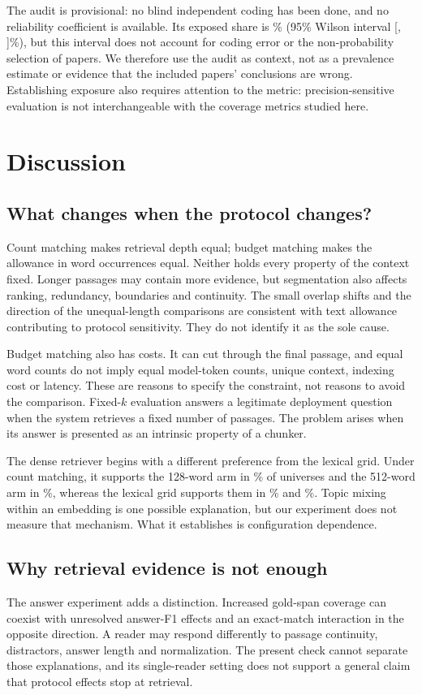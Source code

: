 \documentclass[11pt]{article}
\begin{document}
The audit is provisional: no blind independent coding has been done, and no reliability coefficient is available. Its exposed share is \AuditExposedPct\% (95\% Wilson interval [\AuditExposedLo, \AuditExposedHi]\%), but this interval does not account for coding error or the non-probability selection of papers. We therefore use the audit as context, not as a prevalence estimate or evidence that the included papers' conclusions are wrong. Establishing exposure also requires attention to the metric: precision-sensitive evaluation is not interchangeable with the coverage metrics studied here.

\section{Discussion}\label{sec:discussion}
\subsection{What changes when the protocol changes?}
Count matching makes retrieval depth equal; budget matching makes the allowance in word occurrences equal. Neither holds every property of the context fixed. Longer passages may contain more evidence, but segmentation also affects ranking, redundancy, boundaries and continuity. The small overlap shifts and the direction of the unequal-length comparisons are consistent with text allowance contributing to protocol sensitivity. They do not identify it as the sole cause.

Budget matching also has costs. It can cut through the final passage, and equal word counts do not imply equal model-token counts, unique context, indexing cost or latency. These are reasons to specify the constraint, not reasons to avoid the comparison. Fixed-$k$ evaluation answers a legitimate deployment question when the system retrieves a fixed number of passages. The problem arises when its answer is presented as an intrinsic property of a chunker.

The dense retriever begins with a different preference from the lexical grid. Under count matching, it supports the 128-word arm in \HFiveBCount\% of universes and the 512-word arm in \HFiveCountFiveTwelve\%, whereas the lexical grid supports them in \PoneCountOneTwoEight\% and \PoneCountFiveTwelve\%. Topic mixing within an embedding is one possible explanation, but our experiment does not measure that mechanism. What it establishes is configuration dependence.

\subsection{Why retrieval evidence is not enough}
The answer experiment adds a distinction. Increased gold-span coverage can coexist with unresolved answer-F1 effects and an exact-match interaction in the opposite direction. A reader may respond differently to passage continuity, distractors, answer length and normalization. The present check cannot separate those explanations, and its single-reader setting does not support a general claim that protocol effects stop at retrieval.
\end{document}
